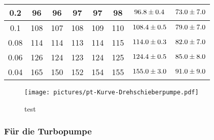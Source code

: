 \begin{table}
\begin{tabular}{c|c|c|c|c|c|c|c}
    0.2  & 96  & 96  & 97  & 97  & 98  & $\num{96.8 +- 0.4}$ & $\num{73.0 +- 7.0}$ \\
    \hline
    0.1  & 108 & 107 & 108 & 109 & 110 & $\num{108.4 +- 0.5}$ & $\num{79.0 +- 7.0}$ \\
    0.08 & 114 & 114 & 113 & 114 & 115 & $\num{114.0 +- 0.3}$ & $\num{82.0 +- 7.0}$ \\
    0.06 & 126 & 124 & 123 & 124 & 125 & $\num{124.4 +- 0.5}$ & $\num{85.0 +- 8.0}$ \\
    0.04 & 165 & 150 & 152 & 154 & 155 & $\num{155.0 +- 3.0}$ & $\num{91.0 +- 9.0}$ \\
  \end{tabular}
\end{table}

\begin{figure}[H] %
  \centering
  \texttt{[image: pictures/pt-Kurve-Drehschieberpumpe.pdf]}
  \caption{test}
  \label{fig:ptdreh}
\end{figure}


\subsubsection{Für die Turbopumpe}

